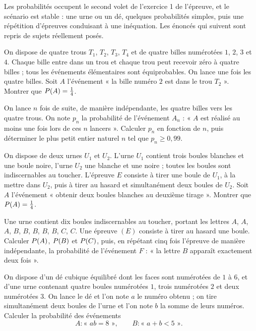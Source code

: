\begin{annales}
Les probabilités occupent le second volet de l'exercice 1 de l'épreuve, et le
scénario est stable : une urne ou un dé, quelques probabilités simples, puis
une répétition d'épreuves conduisant à une inéquation. Les énoncés qui suivent
sont repris de sujets réellement posés.

On dispose de quatre trous $T_{1}$, $T_{2}$, $T_{3}$, $T_{4}$ et de quatre
billes numérotées $1$, $2$, $3$ et $4$. Chaque bille entre dans un trou et
chaque trou peut recevoir zéro à quatre billes ; tous les événements
élémentaires sont équiprobables. On lance une fois les quatre billes. Soit $A$
l'événement « la bille numéro $2$ est dans le trou $T_{2}$ ». Montrer que
$P\!\left(A\right) = \frac14$.

On lance $n$ fois de suite, de manière indépendante, les quatre billes vers
les quatre trous. On note $p_{n}$ la probabilité de l'événement $A_{n}$ :
« $A$ est réalisé au moins une fois lors de ces $n$ lancers ». Calculer
$p_{n}$ en fonction de $n$, puis déterminer le plus petit entier naturel $n$
tel que $p_{n} \geq 0{,}99$.

On dispose de deux urnes $U_{1}$ et $U_{2}$. L'urne $U_{1}$ contient trois
boules blanches et une boule noire, l'urne $U_{2}$ une blanche et une noire ;
toutes les boules sont indiscernables au toucher. L'épreuve $E$ consiste à
tirer une boule de $U_{1}$, à la mettre dans $U_{2}$, puis à tirer au hasard et
simultanément deux boules de $U_{2}$. Soit $A$ l'événement « obtenir deux
boules blanches au deuxième tirage ». Montrer que
$P\!\left(A\right) = \frac14$.

Une urne contient dix boules indiscernables au toucher, portant les lettres
$A$, $A$, $A$, $B$, $B$, $B$, $B$, $B$, $C$, $C$. Une épreuve $(E)$ consiste à
tirer au hasard une boule. Calculer $P\!\left(A\right)$, $P\!\left(B\right)$ et
$P\!\left(C\right)$, puis, en répétant cinq fois l'épreuve de manière indépendante, la
probabilité de l'événement $F$ : « la lettre $B$ apparaît exactement deux
fois ».

On dispose d'un dé cubique équilibré dont les faces sont numérotées de $1$ à
$6$, et d'une urne contenant quatre boules numérotées $1$, trois numérotées
$2$ et deux numérotées $3$. On lance le dé et l'on note $a$ le numéro obtenu ;
on tire simultanément deux boules de l'urne et l'on note $b$ la somme de leurs
numéros. Calculer la probabilité des événements
\[
  A : \text{« } ab = 8 \text{ »}, \qquad
  B : \text{« } a+b<5 \text{ »} .
\]


\end{annales}
